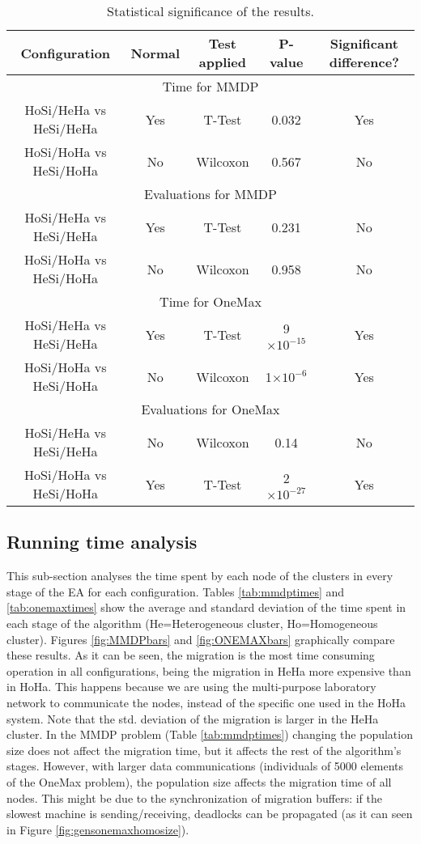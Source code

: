 \documentclass[final,1p,times]{elsarticle}
\providecommand{\e}[1]{\ensuremath{\times 10^{#1}}}
\begin{document}
\begin{table}
\centering
\caption{Statistical significance of the results.}
\begin{tabular}{|c|c|c|c|c|} \hline
Configuration     &Normal &Test applied     &P-value & Significant difference?\\ \hline
\multicolumn{5}{|c|}{Time for MMDP} \\ \hline
HoSi/HeHa vs HeSi/HeHa  &Yes  &T-Test     & 0.032    & Yes \\ \hline
HoSi/HoHa vs HeSi/HoHa  &No   &Wilcoxon   &0.567   & No \\ \hline \hline
\multicolumn{5}{|c|}{Evaluations for MMDP}  \\ \hline
HoSi/HeHa vs HeSi/HeHa  &Yes  &T-Test     &0.231  & No \\ \hline
HoSi/HoHa vs HeSi/HoHa  &No   &Wilcoxon   &0.958  & No \\ \hline \hline
\multicolumn{5}{|c|}{Time for OneMax} \\ \hline
HoSi/HeHa vs HeSi/HeHa  & Yes & T-Test    &  9\e{-15} & Yes \\ \hline
HoSi/HoHa vs HeSi/HoHa  & No  & Wilcoxon    &   1\e{-6} & Yes \\ \hline \hline
\multicolumn{5}{|c|}{Evaluations for OneMax}  \\ \hline
HoSi/HeHa vs HeSi/HeHa  & No  & Wilcoxon    & 0.14    & No\\ \hline
HoSi/HoHa vs HeSi/HoHa  & Yes & T-Test    & 2\e{-27}  & Yes \\ \hline

\end{tabular}
\label{tab:significance}
\end{table}

\subsection{Running time analysis}

This sub-section analyses the time spent by each node of the clusters in every stage of the EA for each configuration. Tables \ref{tab:mmdptimes} and \ref{tab:onemaxtimes} show the average and standard deviation of the time spent in each stage of the algorithm (He=Heterogeneous cluster, Ho=Homogeneous cluster). Figures \ref{fig:MMDPbars} and \ref{fig:ONEMAXbars} graphically compare these results. As it can be seen, the migration is the most time consuming operation in all configurations, being the migration in HeHa more expensive than in HoHa. This happens because we are using the multi-purpose laboratory network to communicate the nodes, instead of the specific one used in the HoHa system. Note that the std. deviation of the migration is larger in the HeHa cluster. In the MMDP problem (Table \ref{tab:mmdptimes}) changing the population size does not affect the migration time, but it affects the rest of the algorithm's stages. However, with larger data communications (individuals of 5000 elements of the OneMax problem), the population size affects the migration time of all nodes. This might be due to the synchronization of migration buffers: if the slowest machine is sending/receiving, deadlocks can be propagated (as it can seen in Figure \ref{fig:gensonemaxhomosize}). 
\end{document}
